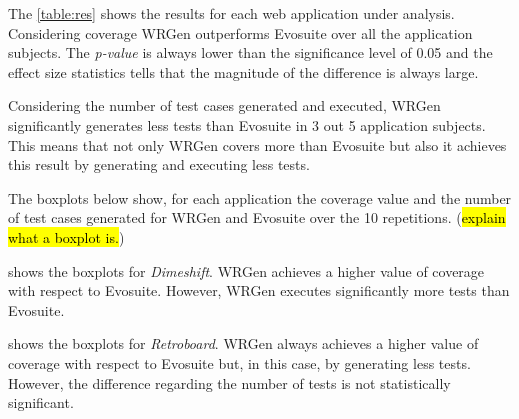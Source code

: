 The \autoref{table:res} shows the results for each web application under analysis. Considering coverage WRGen outperforms Evosuite over all the application subjects. The \textit{p-value} is always lower than the significance level of 0.05 and the effect size statistics tells that the magnitude of the difference is always large.

Considering the number of test cases generated and executed, WRGen significantly generates less tests than Evosuite in 3 out 5 application subjects. This means that not only WRGen covers more than Evosuite but also it achieves this result by generating and executing less tests.


\begin{figure}[H]
	\centering
	
	
\end{figure}

The boxplots below show, for each application the coverage value and the number of test cases generated for WRGen and Evosuite over the 10 repetitions. (\hl{explain what a boxplot is.})


 shows the boxplots for \textit{Dimeshift}. WRGen achieves a higher value of coverage with respect to Evosuite. However, WRGen executes significantly more tests than Evosuite.

 shows the boxplots for \textit{Retroboard}. WRGen always achieves a higher value of coverage with respect to Evosuite but, in this case, by generating less tests. However, the difference regarding the number of tests is not statistically significant.


